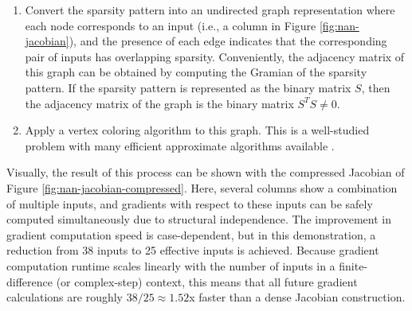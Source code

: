 \begin{enumerate}
    \item Convert the sparsity pattern into an undirected graph representation where each node corresponds to an input (i.e., a column in Figure \ref{fig:nan-jacobian}), and the presence of each edge indicates that the corresponding pair of inputs has overlapping sparsity. Conveniently, the adjacency matrix of this graph can be obtained by computing the Gramian of the sparsity pattern. If the sparsity pattern is represented as the binary matrix $S$, then the adjacency matrix of the graph is the binary matrix $S^T S \neq 0$.
    \item Apply a vertex coloring algorithm to this graph. This is a well-studied problem with many efficient approximate algorithms available \cite{kubale_graph_2004}.
\end{enumerate}

Visually, the result of this process can be shown with the compressed Jacobian of Figure \ref{fig:nan-jacobian-compressed}. Here, several columns show a combination of multiple inputs, and gradients with respect to these inputs can be safely computed simultaneously due to structural independence. The improvement in gradient computation speed is case-dependent, but in this demonstration, a reduction from 38 inputs to 25 effective inputs is achieved. Because gradient computation runtime scales linearly with the number of inputs in a finite-difference (or complex-step) context, this means that all future gradient calculations are roughly $38/25 \approx 1.52$x faster than a dense Jacobian construction.


